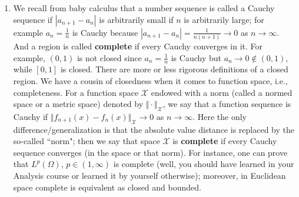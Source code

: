 \documentclass[6pt]{article}
\newtheorem{solution}{Solution}
\numberwithin{equation}{section}
\begin{document}
\begin{enumerate}
\begin{equation}\label{cauchy}
      f(x)=\sum_{n=1}^\infty C_n\sin nx.
\end{equation}
    Find $C_n$.  Now let us approximate it by the sum of the first $N$ terms as before
\begin{equation}\label{limit}
     f_N(x):=\sum_{n=1}^N C_n\sin nx
\end{equation}
for some large $N$.  Plot $f_N(x)$ over $(-\pi,\pi)$ for $N=2,4,8,16$ on the same graph.  Try $N=16,32$ and $64$ again.  What are your observations?  You can try with even larger $N$.

\begin{solution}
I skip the calculations and $C_n=\frac{2}{n}(1-(-1)^n)$.  The Gibbs phenomenon is evident from the plot.

\begin{figure}[h!]\vspace{-2mm}
  \centering
\texttt{[image: figures/hw5figure9.eps]}
\caption{Finite sum $f^N$ and oscillations for $N$ large.  We observe the non-convergence (in pointwise sense) of $f^N$ for $N$ large, though the error converges to zero in $L^2$.  Again this is because its limit is merely $L^2$, but not continuous, hence pointwise convergence is not expected.}
\end{figure}
\end{solution}


\item We recall from baby calculus that a number sequence is called a Cauchy sequence if $|a_{n+1}-a_n|$ is arbitrarily small if $n$ is arbitrarily large; for example $a_n=\frac{1}{n}$ is Cauchy because $|a_{n+1}-a_{n}|=\frac{1}{n(n+1)}\rightarrow 0$ as $n\rightarrow \infty$.  And a region is called \textbf{complete} if every Cauchy converges in it.  For example, $(0,1)$ is not closed since $a_n=\frac{1}{n}$ is Cauchy but $a_n\rightarrow 0\not\in (0,1)$, while $[0,1]$ is closed.  There are more or less rigorous definitions of a closed region.  We have a cousin of closedness when it comes to function space, i.e., completeness.  For a function space $\mathcal X$ endowed with a norm (called a normed space or a metric space) denoted by $\Vert \cdot \Vert_{\mathcal X}$, we say that a function sequence is Cauchy if $\Vert f_{n+1}(x)-f_n(x) \Vert_{\mathcal X}\rightarrow 0$ as $n\rightarrow \infty$.  Here the only difference/generalization is that the absolute value distance is replaced by the so-called ``norm"; then we say that space $\mathcal X$ is \textbf{complete} if every Cauchy sequence converges (in the space or that norm).  For instance, one can prove that $L^p(\Omega)$, $p\in(1,\infty)$ is complete (well, you should have learned in your Analysis course or learned it by yourself otherwise); moreover, in Euclidean space complete is equivalent as closed and bounded.


\end{enumerate}
\end{document}
